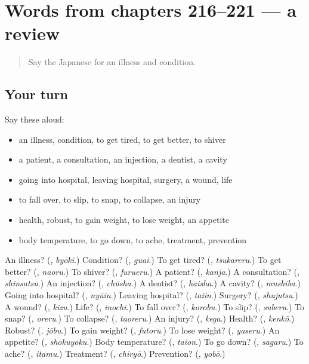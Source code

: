 \section[(dialogue)]{Words from chapters 216–221 — a review}

\label{lesson:JA-R221-review-216-221}



\begin{quote}
Say the Japanese for an illness and condition.
\end{quote}

\subsection*{Your turn}
Say these aloud:

\begin{itemize}
\raggedright
  \item an illness, condition, to get tired, to get better, to shiver
  \item a patient, a consultation, an injection, a dentist, a cavity
  \item going into hospital, leaving hospital, surgery, a wound, life
  \item to fall over, to slip, to snap, to collapse, an injury
  \item health, robust, to gain weight, to lose weight, an appetite
  \item body temperature, to go down, to ache, treatment, prevention
\end{itemize}

\begin{tcolorbox}[breakable,colback=teal!4,colframe=teal!35!black,title={Before you move on}]
An illness? (\textbf{}, \emph{byōki}.) Condition? (\textbf{}, \emph{guai}.) To get tired? (\textbf{}, \emph{tsukareru}.) To get better? (\textbf{}, \emph{naoru}.) To shiver? (\textbf{}, \emph{furueru}.) A patient? (\textbf{}, \emph{kanja}.) A consultation? (\textbf{}, \emph{shinsatsu}.) An injection? (\textbf{}, \emph{chūsha}.) A dentist? (\textbf{}, \emph{haisha}.) A cavity? (\textbf{}, \emph{mushiba}.) Going into hospital? (\textbf{}, \emph{nyūin}.) Leaving hospital? (\textbf{}, \emph{taiin}.) Surgery? (\textbf{}, \emph{shujutsu}.) A wound? (\textbf{}, \emph{kizu}.) Life? (\textbf{}, \emph{inochi}.) To fall over? (\textbf{}, \emph{korobu}.) To slip? (\textbf{}, \emph{suberu}.) To snap? (\textbf{}, \emph{oreru}.) To collapse? (\textbf{}, \emph{taoreru}.) An injury? (\textbf{}, \emph{kega}.) Health? (\textbf{}, \emph{kenkō}.) Robust? (\textbf{}, \emph{jōbu}.) To gain weight? (\textbf{}, \emph{futoru}.) To lose weight? (\textbf{}, \emph{yaseru}.) An appetite? (\textbf{}, \emph{shokuyoku}.) Body temperature? (\textbf{}, \emph{taion}.) To go down? (\textbf{}, \emph{sagaru}.) To ache? (\textbf{}, \emph{itamu}.) Treatment? (\textbf{}, \emph{chiryō}.) Prevention? (\textbf{}, \emph{yobō}.)
\end{tcolorbox}
